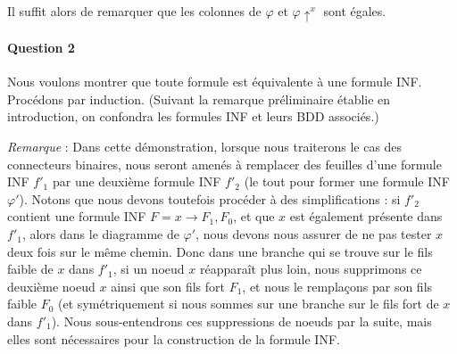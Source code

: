 \documentclass[a4paper,11pt]{article}
\begin{document}
		Il suffit alors de remarquer que les colonnes de $\varphi$ et $\varphi\uparrow^{x}$ sont égales.
		
		\paragraph{Question 2}
		
		Nous voulons montrer que toute formule est équivalente à une formule INF.
		Procédons par induction.
		(Suivant la remarque préliminaire établie en introduction, on confondra les formules INF et leurs BDD associés.)
		
		\emph{Remarque} :  Dans cette démonstration, lorsque nous traiterons le cas des connecteurs binaires, nous seront amenés à remplacer des feuilles d'une formule INF ${f'}_1$ par une deuxième formule INF ${f'}_2$ (le tout pour former une formule INF $\varphi'$).
		Notons que nous devons toutefois procéder à des simplifications : si ${f'}_2$ contient une formule INF $F = x \rightarrow F_1,F_0$, et que $x$ est également présente dans ${f'}_1$, alors dans le diagramme de $\varphi'$, nous devons nous assurer de ne pas tester $x$ deux fois sur le même chemin. Donc dans une branche qui se trouve sur le fils faible de $x$ dans ${f'}_1$, si un noeud $x$ réapparaît plus loin, nous supprimons ce deuxième noeud $x$ ainsi que son fils fort $F_1$, et nous le remplaçons par son fils faible $F_0$ (et symétriquement si nous sommes sur une branche sur le fils fort de $x$ dans ${f'}_1$). Nous sous-entendrons ces suppressions de noeuds par la suite, mais elles sont nécessaires pour la construction de la formule INF.
		
\end{document}
